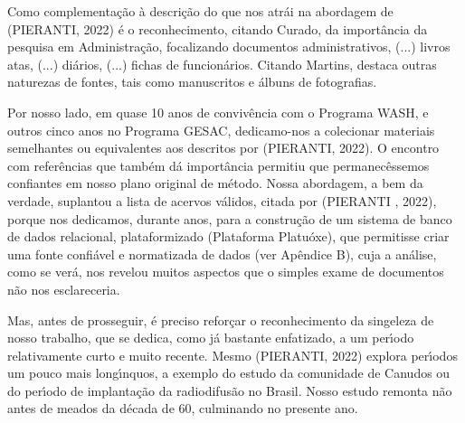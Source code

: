 \documentclass[
12pt,		%
openright,	%
twoside,  %
a4paper,			%
chapter=TITLE,		%
english,			%
french,				%
spanish,			%
brazil				%
]{USPSC-classe/USPSC}
\begin{document}
Como complementa\c{c}\~ao \`a descri\c{c}\~ao do que nos atr\'ai na abordagem de  (PIERANTI, 2022) \'e o reconhecimento, citando Curado, da import\^ancia da pesquisa em Administra\c{c}\~ao, focalizando \textquotedbl documentos administrativos, (...) livros atas, (...) di\'arios, (...) fichas de funcion\'arios\textquotedbl . Citando Martins, destaca outras naturezas de fontes, tais como manuscritos e \'albuns de fotografias.

















Por nosso lado, em quase 10 anos de conviv\^encia com o Programa WASH, e outros cinco anos no Programa GESAC, dedicamo-nos a colecionar materiais semelhantes ou equivalentes aos descritos por (PIERANTI, 2022). O encontro com refer\^encias que tamb\'em d\'a import\^ancia permitiu que permanec\^essemos confiantes em nosso plano original de m\'etodo. Nossa abordagem, a bem da verdade, suplantou a lista de acervos v\'alidos, citada por (PIERANTI , 2022), porque nos dedicamos, durante anos, para a constru\c{c}\~ao de um sistema de banco de dados relacional, plataformizado (Plataforma Platu\'oxe), que permitisse criar uma fonte confi\'avel e normatizada de dados (ver Ap\^endice B), cuja a an\'alise, como se ver\'a, nos revelou muitos aspectos que o simples exame de documentos n\~ao nos esclareceria.

















Mas, antes de prosseguir, \'e preciso refor\c{c}ar o reconhecimento da singeleza de nosso trabalho, que se dedica, como j\'a bastante enfatizado, a um per\'{\i}odo relativamente curto e muito recente. Mesmo (PIERANTI, 2022) explora per\'{\i}odos um pouco mais long\'{\i}nquos, a exemplo do estudo da comunidade de Canudos ou do per\'{\i}odo de implanta\c{c}\~ao da radiodifus\~ao no Brasil. Nosso estudo remonta n\~ao antes de meados da d\'ecada de 60, culminando no presente ano.
\end{document}

